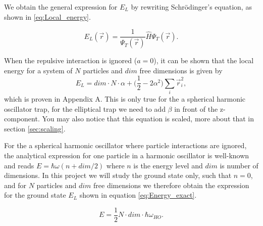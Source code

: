 \documentclass[norsk,a4paper,12pt]{article}
\begin{document}
We obtain the general  expression for $E_L$ by rewriting Schr\"{o}dinger's equation, as shown in \ref{eq:Local_energy}.

\begin{equation}
E_L(\vec{r})=\frac{1}{\Psi_T(\vec{r})}\hat{H}\Psi_T(\vec{r}).
\label{eq:Local_energy}
\end{equation}

When the repulsive interaction is ignored ($a=0$), it can be shown that the local energy for a system of $N$ particles and $dim$ free dimensions is given by
\begin{equation}
E_L=dim\cdot N\cdot \alpha + \Big(\frac{1}{2}-2\alpha^2\Big)\sum_i\vec{r}_i^2,
\end{equation}
which is proven in Appendix A. This is only true for the a spherical harmonic oscillator trap, for the elliptical trap we need to add $\beta$ in front of the z-component. You may also notice that this equation is scaled, more about that in section \ref{sec:scaling}.

For the a spherical harmonic oscillator where particle interactions are ignored, the analytical expression for one particle in a harmonic oscillator is well-known and reads $E = \hbar\omega(n + dim/2)$ where $n$ is the energy level and $dim$ is number of dimensions. In this project we will study the ground state only, such that $n=0$, and for $N$ particles and $dim$ free dimensions we therefore obtain the expression for the ground state $E_L$ shown in equation \ref{eq:Energy_exact}.

\begin{equation}
E = \frac{1}{2}N\cdot dim\cdot\hbar\omega_{HO}.
\label{eq:Energy_exact}
\end{equation}
\end{document}
